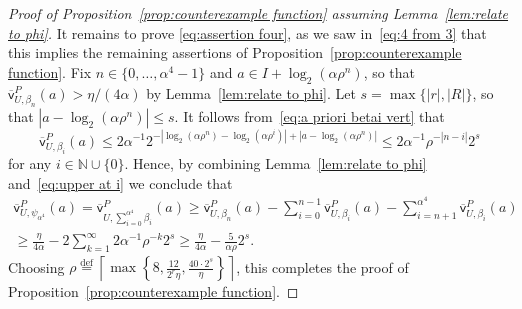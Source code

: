 \documentclass[11pt,reqno]{amsart}
\newcommand{\N}{\mathbb{N}}
\newcommand{\0}{\mathbf{0}}
\renewcommand{\1}{\mathbf 1}
\newcommand{\eqdef}{\stackrel{\mathrm{def}}{=}}
\renewcommand{\ge}{\geqslant}
\renewcommand{\le}{\leqslant}
\theoremstyle{remark}
\newcommand{\vpP}[1]{{\overline{\mathsf{v}}^{P}_{\!#1}}}
\begin{document}
\begin{proof}[Proof of Proposition~\ref{prop:counterexample function} assuming Lemma~\ref{lem:relate to phi}]
It remains to prove \eqref{eq:assertion four}, as we saw in~\eqref{eq:4 from 3} that this implies the remaining assertions of Proposition~\ref{prop:counterexample function}. Fix $n\in \{0,\ldots,\alpha^4-1\}$ and $a\in I+  \log_2(\alpha\rho^{n})$, so that $\vpP{U,\beta_n}(a) >\eta/(4\alpha)$ by Lemma~\ref{lem:relate to phi}. Let $s=\max\{|r|,|R|\}$, so that $|a-\log_2(\alpha\rho^n)|\le s$.  It follows from~\eqref{eq:a priori betai vert} that
\begin{equation}\label{eq:upper at i}
  \vpP{U,\beta_i}(a) \le 2\alpha^{-1} 2^{-|\log_2(\alpha\rho^n)-\log_2(\alpha\rho^i)| + |a-\log_2(\alpha\rho^n)|}\le 2\alpha^{-1}\rho^{-|n-i|} 2^s
\end{equation}
for any $i\in \N\cup \{0\}$.
Hence, by combining Lemma~\ref{lem:relate to phi} and~\eqref{eq:upper at i} we conclude that
\begin{multline*}
\vpP{U,\psi_{\alpha^4}}(a)=\vpP{U,\sum_{i=0}^{\alpha^4}\beta_i}(a)
\ge \vpP{U,\beta_n}(a)-\sum_{i=0}^{n-1}\vpP{U,\beta_i}(a)-\sum_{i=n+1}^{\alpha^4}\vpP{U,\beta_i}(a)\\\ge \frac{\eta}{4\alpha} - 2 \sum_{k=1}^{\infty}2\alpha^{-1}\rho^{-k} 2^{s}\ge \frac{\eta}{4\alpha} - \frac{5}{\alpha\rho} 2^{s}.
\end{multline*}
Choosing $\rho\eqdef \left\lceil \max\left\{8, \frac{12}{2^r\eta}, \frac{40 \cdot 2^s }{ \eta}\right\}\right\rceil$, this completes the proof of Proposition~\ref{prop:counterexample function}.\qedhere
\end{proof}
\end{document}

